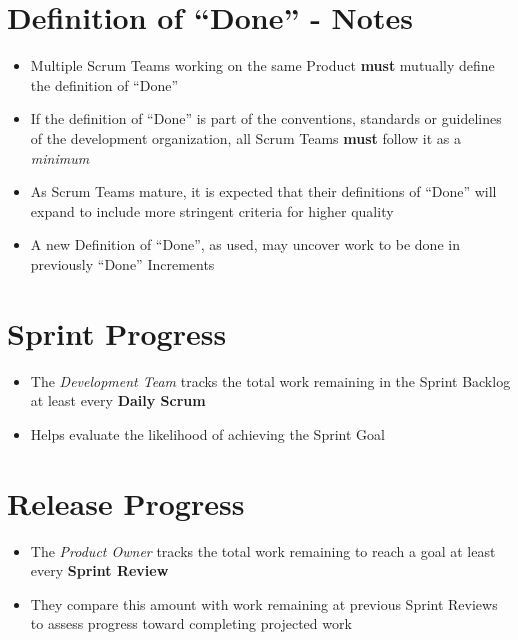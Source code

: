 \documentclass[a4paper,11pt,twocolumn]{article}
\begin{document}
\section*{Definition of ``Done'' - Notes}
\begin{itemize}
    \item Multiple Scrum Teams working on the same Product \textbf{must} mutually define the definition of ``Done''
    \item If the definition of ``Done'' is part of the conventions, standards or guidelines of the development organization, all Scrum Teams \textbf{must} follow it as a \textit{minimum}
	\item As Scrum Teams mature, it is expected that their definitions of ``Done'' will expand to include more stringent criteria for higher quality
	\item A new Definition of ``Done'', as used, may uncover work to be done in previously ``Done'' Increments
\end{itemize}

\section*{Sprint Progress}
\begin{itemize}
    \item The \textit{Development Team} tracks the total work remaining in the Sprint Backlog at least every \textbf{Daily Scrum}
    \item Helps evaluate the likelihood of achieving the Sprint Goal
\end{itemize}

\section*{Release Progress}
\begin{itemize}
    \item The \textit{Product Owner} tracks the total work remaining to reach a goal at least every \textbf{Sprint Review}
    \item They compare this amount with work remaining at previous Sprint Reviews to assess progress toward completing projected work
\end{itemize}

\nocite{*}


\end{document}
